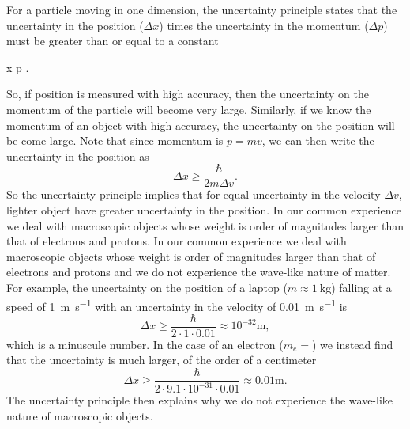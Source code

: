 For a particle moving in one dimension, the uncertainty principle states that the uncertainty in the position ($\Delta x$) times the uncertainty in the momentum ($\Delta p$) must be greater than or equal to a constant
\begin{iequation}
\Delta x \Delta p \geq {}.
\end{iequation}
So, if position is measured with high accuracy, then the uncertainty on the momentum of the particle will become very large.
Similarly, if we know the momentum of an object with high accuracy, the uncertainty on the position will be come large.
Note that since momentum is $p = mv$, we can then write the uncertainty in the position as
\begin{equation}
\Delta x \geq \frac{\hbar}{2 m \Delta v}.
\end{equation}
So the uncertainty principle implies that for equal  uncertainty in the velocity $\Delta v$, lighter object have greater uncertainty in the position.
In our common experience we deal with macroscopic objects whose weight is order of magnitudes larger than that of electrons and protons.
In our common experience we deal with macroscopic objects whose weight is order of magnitudes larger than that of electrons and protons and we do not experience the wave-like nature of matter.
For example, the uncertainty on the position of a laptop ($m \approx \SI{1}{\kilo\gram}$) falling at a speed of \SI{1}{\meter\per\second} with an uncertainty in the velocity of  \SI{0.01}{\meter\per\second} is
\begin{equation}
\Delta x \geq \frac{\hbar}{2 \cdot 1 \cdot 0.01} \approx 10^{-32} \si{\meter},
\end{equation}
which is a minuscule number. In the case of an electron ($m_e = $) we instead find that the uncertainty is much larger, of the order of a centimeter
\begin{equation}
\Delta x \geq \frac{\hbar}{2 \cdot 9.1 \cdot 10^{-31} \cdot 0.01} \approx 0.01 \si{\meter}.
\end{equation}
The uncertainty principle then explains why we do not experience the wave-like nature of macroscopic objects.

